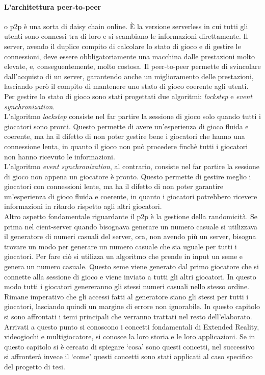         \paragraph{L'architettura peer-to-peer} o p2p è una sorta di daisy chain online. È la versione serverless in cui tutti gli utenti sono connessi tra di loro e si scambiano le 
            informazioni direttamente. Il server, avendo il duplice compito di calcolare lo stato di gioco e di gestire le connessioni, deve essere obbligatoriamente una macchina 
            dalle prestazioni molto elevate, e, conseguentemente, molto costosa. Il peer-to-peer permette di svincolare dall'acquisto di un server, garantendo anche un miglioramento 
            delle prestazioni, lasciando però il compito di mantenere uno stato di gioco coerente agli utenti.\\
            Per gestire lo stato di gioco sono stati progettati due algoritmi: \textit{lockstep} e \textit{event synchronization}.\\
            L'algoritmo \textit{lockstep} consiste nel far partire la sessione di gioco solo quando tutti i giocatori sono pronti. Questo permette di avere un'esperienza di gioco
            fluida e coerente, ma ha il difetto di non poter gestire bene i giocatori che hanno una connessione lenta, in quanto il gioco non può procedere finchè tutti i giocatori
            non hanno ricevuto le informazioni.\\
            L'algoritmo \textit{event synchronization}, al contrario, consiste nel far partire la sessione di gioco non appena un giocatore è pronto. Questo permette di gestire meglio
            i giocatori con connessioni lente, ma ha il difetto di non poter garantire un'esperienza di gioco fluida e coerente, in quanto i giocatori potrebbero ricevere informazioni 
            in ritardo rispetto agli altri giocatori.\\
            Altro aspetto fondamentale riguardante il p2p è la gestione della randomicità. Se prima nel cient-server quando bisognava generare un numero casuale si utilizzava il
            generatore di numeri casuali del server, ora, non avendo più un server, bisogna trovare un modo per generare un numero casuale che sia uguale per tutti i giocatori.
            Per fare ciò si utilizza un algoritmo che prende in input un seme e genera un numero casuale. Questo seme viene generato dal primo giocatore che si connette alla sessione
            di gioco e viene inviato a tutti gli altri giocatori. In questo modo tutti i giocatori genereranno gli stessi numeri casuali nello stesso ordine. Rimane imperativo 
            che gli accessi fatti al generatore siano gli stessi per tutti i giocatori, lasciando quindi un margine di errore non ignorabile.
    \newline \newline
    In questo capitolo si sono affrontati i temi principali che verranno trattati nel resto dell'elaborato. Arrivati a questo punto si conoscono i concetti fondamentali di 
    Extended Reality, videogiochi e multigiocatore, si conosce la loro storia e le loro applicazioni. Se in questo capitolo si è cercato di spiegare `cosa' sono questi concetti, 
    nel successivo si affronterà invece il `come' questi concetti sono stati applicati al caso specifico del progetto di tesi.